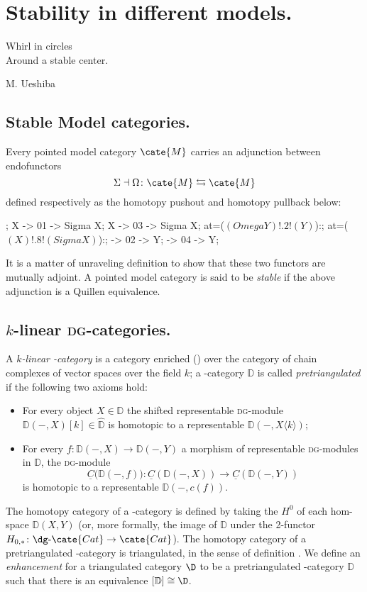 \documentclass[11pt, a4paper]{amsart}
\newcommand{\pullback}[2]{\obj at=($(#1)!.2!(#2)$):{\lrcorner}}
\newcommand{\pushout}[2]{\obj  at=($(#1)!.8!(#2)$):{\ulcorner}}
\begin{document}
\section{Stability in different models.}\label{model.stable}
\epigraph{Whirl in circles\\ Around a stable center.}{M\@. Ueshiba}
\subsection{Stable Model categories.}
Every pointed model category \cite[\achap \textbf{7}]{Hov} $\cate{M}$ carries an adjunction between endofunctors
\[
\Sigma \dashv \Omega \colon \cate{M} \leftrightarrows \cate{M}
\]
defined respectively as the homotopy pushout and homotopy pullback below:
\begin{center}
\begin{kD}
;
\mor X -> 01 -> {Sigma X};
\mor X -> 03 -> {Sigma X};
\pullback{Omega Y}{Y};
\pushout{X}{Sigma X};
 -> 02 -> Y;
 -> 04 -> Y;
\end{kD}
\end{center}
It is a matter of unraveling definition to show that these two functors are mutually adjoint. A pointed model category is said to be \emph{stable} if the above adjunction is a Quillen equivalence.
\subsection{$k$-linear \textsc{dg}-categories.}
A \emph{$k$-linear \dg-category} is a category enriched (\cite{kelly1982basic,nashphd}) over the category of chain complexes of vector spaces over the field $k$; a \dg-category $\mathbb{D}$ is called \emph{pretriangulated} if the following two axioms hold:
\begin{itemize}
\item For every object $X\in\mathbb{D}$ the shifted representable \textsc{dg}-module $\mathbb{D}(-,X)[k]\in \widehat{\mathbb{D}}$ is homotopic to a representable $\mathbb{D}(-, X\langle k\rangle)$;
\item For every $f\colon \mathbb{D}(-,X)\to \mathbb{D}(-,Y)$ a morphism of representable \textsc{dg}-modules in $\widehat{\mathbb{D}}$, the \textsc{dg}-module
\[
\underline C\big(\mathbb{D}(-,f) \big)\colon \underline C(\mathbb{D}(-,X))\to \underline C(\mathbb{D}(-,Y))
\]
is homotopic to a representable $\mathbb{D}(-, c(f))$.
\end{itemize}
The homotopy category of a \dg-category is defined by taking the $H^0$ of each hom-space $\mathbb{D}(X,Y)$ (or, more formally, the image of $\mathbb{D}$ under the 2-functor $H_{0,*}\colon \dg\text{-}\cate{Cat}\to \cate{Cat}$). The homotopy category of a pretriangulated \dg-category is triangulated, in the sense of definition . We define an \emph{enhancement} for a triangulated category $\D$ to be a pretriangulated \dg-category $\mathbb{D}$ such that there is an equivalence $[\mathbb{D}]\cong \D$.
\end{document}
